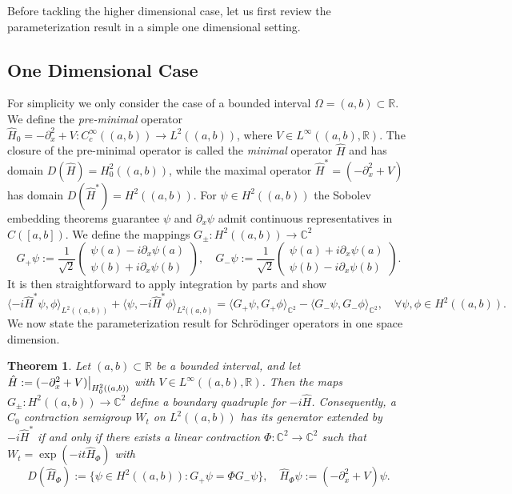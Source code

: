 \documentclass{article}
\numberwithin{equation}{section}
\newtheorem{theorem}{Theorem}[section]
\begin{document}
Before tackling the higher dimensional case, let us first review the parameterization result in a simple one dimensional setting.
\subsection{One Dimensional Case}
For simplicity we only consider the case of a bounded interval $\Omega=(a,b)\subset \mathbb{R}$. We define the \textit{pre-minimal} operator $\hat{H}_0=-\partial_x^2 + V:C_c^\infty((a,b))\to L^2((a,b))$, where $V\in L^\infty((a,b),\mathbb{R})$. The closure of the pre-minimal operator is called the \textit{minimal} operator $\hat{H}$ and has domain $D(\hat{H})=H^2_0((a,b))$, while the maximal operator $\hat{H}^*=(-\partial_x^2 + V)$ has domain $D(\hat{H}^*)=H^2((a,b))$. For $\psi \in H^2((a,b))$ the Sobolev embedding theorems \cite{Brezis} guarantee $\psi$ and $\partial_x \psi$ admit continuous representatives in $C([a,b])$. We define the mappings $G_\pm:H^2((a,b))\to \mathbb{C}^2$
\begin{equation}\label{One D BQ}
    G_+\psi:=\frac{1}{\sqrt{2}}\begin{pmatrix}
        \psi(a)-i \partial_x \psi(a)
        \\
        \psi(b)+i \partial_x \psi(b)
    \end{pmatrix}, \quad G_-\psi:=\frac{1}{\sqrt{2}}\begin{pmatrix}
        \psi(a)+i \partial_x \psi(a)
        \\
        \psi(b)-i \partial_x \psi(b)
    \end{pmatrix}.
\end{equation}
It is then straightforward to apply integration by parts and show
\begin{equation}\label{One D Flux}
    \langle -i\hat{H}^*\psi, \phi \rangle_{L^2((a,b))} + \langle \psi, -i\hat{H}^*\phi \rangle_{L^2((a,b)}= \langle G_+ \psi, G_+ \phi \rangle_{\mathbb{C}^2} - \langle G_- \psi, G_- \phi \rangle_{\mathbb{C}^2}, \quad \forall \psi, \phi \in H^2((a,b)).
\end{equation}
We now state the parameterization result for Schr\"odinger operators in one space dimension.
\begin{theorem}\cite[Theorem 6.5]{Arendt2023} Let $(a,b)\subset \mathbb{R}$ be a bounded interval, and let $\hat{H}:=(-\partial_x^2 +V)\big{|}_{H^2_0((a,b))}$ with $V \in L^\infty((a,b),\mathbb{R})$. Then the maps $G_\pm:H^2((a,b))\to \mathbb{C}^2$ define a boundary quadruple for $-i\hat{H}$. Consequently, a $C_0$ contraction semigroup $W_t$ on $L^2((a,b))$ has its generator extended by $-i\hat{H}^*$ if and only if there exists a linear contraction $\Phi:\mathbb{C}^2\to \mathbb{C}^2$ such that $W_t=\exp(-it\hat{H}_\Phi)$ with
    \begin{equation}
        D(\hat{H}_\Phi):= \{ \psi \in H^2((a,b)): G_+\psi=\Phi G_-\psi\}, \quad \hat{H}_\Phi\psi:=(-\partial_x^2 + V)\psi.
    \end{equation}
\end{theorem}
\end{document}
